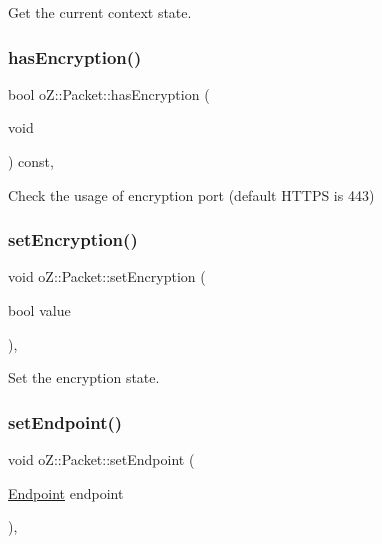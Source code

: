Get the current context\textquotesingle{} state. 

\mbox{\label{classo_z_1_1_packet_abf9bd4979afb439272832d5a90f7d556}} 
\subsubsection{\texorpdfstring{hasEncryption()}{hasEncryption()}}
{\footnotesize\ttfamily bool o\+Z\+::\+Packet\+::has\+Encryption (\begin{DoxyParamCaption}\item[{void}]{ }\end{DoxyParamCaption}) const\hspace{0.3cm}{\ttfamily [inline]}, {\ttfamily [noexcept]}}



Check the usage of encryption port (default H\+T\+T\+PS is 443) 

\mbox{\label{classo_z_1_1_packet_acb3412cd14f3dd6749f8dfa0892f4bf4}} 
\subsubsection{\texorpdfstring{setEncryption()}{setEncryption()}}
{\footnotesize\ttfamily void o\+Z\+::\+Packet\+::set\+Encryption (\begin{DoxyParamCaption}\item[{bool}]{value }\end{DoxyParamCaption})\hspace{0.3cm}{\ttfamily [inline]}, {\ttfamily [noexcept]}}



Set the encryption state. 

\mbox{\label{classo_z_1_1_packet_a53cd7a27e65dcb1667d9a0beb1dc2f66}} 
\subsubsection{\texorpdfstring{setEndpoint()}{setEndpoint()}}
{\footnotesize\ttfamily void o\+Z\+::\+Packet\+::set\+Endpoint (\begin{DoxyParamCaption}\item[{\mbox{\hyperlink{classo_z_1_1_endpoint}{Endpoint}}}]{endpoint }\end{DoxyParamCaption})\hspace{0.3cm}{\ttfamily [inline]}, {\ttfamily [noexcept]}}



